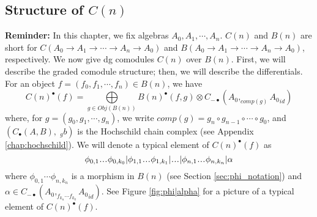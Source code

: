 \subsection{Structure of $C(n)$}
\textbf{Reminder:} In this chapter, we fix algebras $A_0, A_1, \cdots, A_n$.
$C(n)$ and $B(n)$ are short for $C(A_0 \to A_1 \to \cdots \to A_n \to A_0)$
and $B(A_0 \to A_1 \to \cdots \to A_n \to A_0)$, respectively.
\newline
\newline
We now give dg comodules $C(n)$ over $B(n)$.
First, we will describe the graded comodule structure;
then, we will describe the differentials.
For an object $f = (f_0, f_1, \cdots, f_n) \in B(n)$, we have
%
\begin{equation}\label{eq:C(f)}
C(n)^\bullet(f) 
= \bigoplus\limits_{g \in Obj(B(n))} B(n)^\bullet(f,g) \otimes 
C_{-\bullet}(A_0, _{comp(g)}{A_0}_{id})
\end{equation}
%
where, for $g = (g_0, g_1, \cdots, g_n)$, 
we write $comp(g) = g_n \circ g_{n-1} \circ \cdots \circ g_0$,
and $(C_\bullet(A,B),\; _gb)$ is the 
Hochschild chain complex 
(see Appendix \ref{chap:hochschild}).
We will denote a typical element of $C(n)^\bullet(f)$ 
as $$\phi_{0,1}\smdots\phi_{0,k_0} | 
\phi_{1,1}\smdots\phi_{1,k_1} | \smdots |
\phi_{n,1}\smdots\phi_{n,k_n} | \alpha$$
where $\phi_{0,1}\cdots \phi_{n,k_n}$ is a morphism
in $B(n)$ (see Section \ref{sec:phi_notation}) and
$\alpha \in C_{-\bullet}(A_0, _{f_{k_n}\cdots f_{k_0}}{A_0}_{id})$.
See Figure \ref{fig:phi|alpha} for a picture of 
a typical element of $C(n)^\bullet(f)$.

